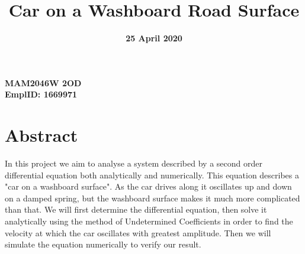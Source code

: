 \documentclass[12pt]{article}
\title{Car on a Washboard Road Surface}
\date{\textbf{25 April 2020}}
\author{}
\begin{document}
    \maketitle
    \begin{center}
    \textbf{\large{MAM2046W 2OD}}\\
    \textbf{\large{EmplID: 1669971}}\\
    \end{center}

    \section*{Abstract}
    In this project we aim to analyse a system described by a second order differential equation 
    both analytically and numerically. This equation describes a "car on a washboard surface". As 
    the car drives along it oscillates up and down on a damped spring, but the washboard surface 
    makes it much more complicated than that. We will first determine the differential equation, 
    then solve it analytically using the method of Undetermined Coefficients in order to find the 
    velocity at which the car oscillates with greatest amplitude. Then we will simulate the equation 
    numerically to verify our result.
\end{document}
